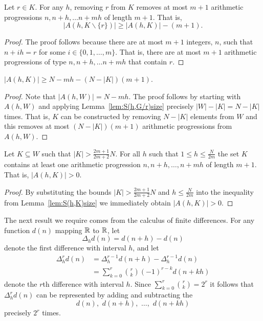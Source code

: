\documentclass[journal]{IEEEtran}
\begin{document}
\begin{lemma} \label{lem:S(h,G/r)size}
Let $r \in K$.  For any $h$, removing $r$ from $K$ removes at most $m+1$ arithmetic progressions $n, n+h, \dots n+mh$ of length $m+1$.  That is,
\[
|A(h,K \backslash \{r\})| \geq |A(h,K)| - (m+1).
\]
\end{lemma}
\begin{proof}
The proof follows because there are at most $m+1$ integers, $n$, such that $n+ih = r$ for some $i \in \{0,1,\dots,m\}$.  That is, there are at most $m+1$ arithmetic progressions of type $n, n+h, \dots n+mh$ that contain $r$.
\end{proof}

 \begin{lemma} \label{lem:S(h,K)size}
 $|A(h,K)| \geq N - mh - (N - |K|)(m+1)$.
 \end{lemma}
 \begin{proof}
 Note that $|A(h,W)| = N - mh$.  The proof follows by starting with $A(h,W)$ and applying Lemma~\ref{lem:S(h,G/r)size} precisely $|W|-|K|=N-|K|$ times. That is, $K$ can be constructed by removing $N - |K|$ elements from $W$ and this removes at most $(N - |K|)(m+1)$ arithmetic progressions from $A(h,W)$.
 \end{proof}
 
 \begin{corollary} \label{cor:S(h,K)>0}
 Let $K \subseteq W$ such that $|K| > \frac{2m+1}{2m+2}N$. For all $h$ such that $1\leq h \leq\frac{N}{2m}$ the set $K$ contains at least one arithmetic progression $n, n+h, \dots, n+mh$ of length $m+1$. That is, $|A(h,K)| > 0$.
 \end{corollary}
 \begin{proof}
 By substituting the bounds $|K| > \frac{2m+1}{2m+2}N$ and $h \leq\frac{N}{2m}$ into the inequality from Lemma~\ref{lem:S(h,K)size} we immediately obtain $|A(h,K)| > 0$.
 \end{proof}

The next result we require comes from the calculus of finite differences. For any function $d(n)$ mapping ${\mathbb R}$ to ${\mathbb R}$, let 
\[
\Delta_h d(n) = d(n+h) - d(n)
\] 
denote the first difference with interval $h$, and let
\begin{equation}\label{eq:mthdiffformula}
\begin{split}
\Delta_h^r d(n) &= \Delta_h^{r-1} d(n+h) - \Delta_h^{r-1} d(n) \\
&= \sum_{k=0}^{r}\binom{r}{k}(-1)^{r-k}d(n+kh)
\end{split}
\end{equation}
denote the $r$th difference with interval $h$. Since $\sum_{k=0}^{r}\binom{r}{k} = 2^r$ it follows that $\Delta_h^r d(n)$ can be represented by adding and subtracting the 
\[
d(n), \,\, d(n+h), \,\, \dots, \,\, d(n+kh)
\] 
precisely $2^r$ times.
\end{document}
